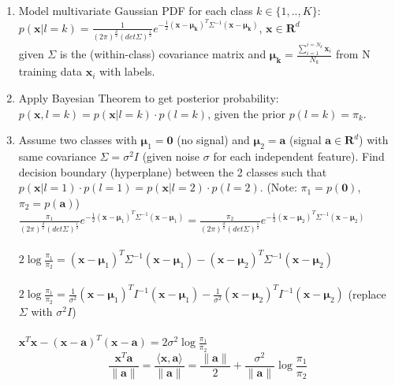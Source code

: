 \documentclass[11pt]{article}
\begin{document}
\begin{enumerate}
    \item Model multivariate Gaussian PDF for each class $k \in \{1,..,K\}$:\\
    $p(\mathbf{x}|l=k) = \frac{1}{{(2\pi)}^{\frac{d}{2}} {(det\Sigma)}^{\frac{1}{2}}} e^{-\frac{1}{2}{(\mathbf{x}-\mathbf{\mu_k})}^T \Sigma^{-1}{(\mathbf{x}-\mathbf{\mu_k})}}$, $\mathbf{x} \in \mathbf{R}^d$\\
    given $\Sigma$ is the (within-class) covariance matrix and $\mathbf{\mu_k} = \frac{\sum_{i=1}^{i=N_k} \mathbf{x}_i}{N_k}$ from N training data $\mathbf{x}_i$ with labels. 
    \item Apply Bayesian Theorem to get posterior probability: $p(\mathbf{x}, l=k) = p(\mathbf{x}|l=k) \cdot p(l=k)$, given the prior $p(l=k) = \pi_k$.
    \item Assume two classes with $\mathbf{\mu}_1 = \mathbf{0}$ (no signal) and $\mathbf{\mu}_2 = \mathbf{a}$ (signal $\mathbf{a} \in \mathbf{R}^d$) with same covariance $\Sigma = \sigma^2 I$ (given noise $\sigma$ for each independent feature). Find decision boundary (hyperplane) between the 2 classes such that $p(\mathbf{x}|l=1)\cdot p(l=1) = p(\mathbf{x}|l=2)\cdot p(l=2)$. (Note: $\pi_1 = p(\mathbf{0})$, $\pi_2 = p(\mathbf{a})$)\\
   
    $\frac{\pi_1}{{(2\pi)}^{\frac{d}{2}} {(det\Sigma)}^{\frac{1}{2}}} e^{-\frac{1}{2}{(\mathbf{x}-\mathbf{\mu}_1)}^T \Sigma^{-1}{(\mathbf{x}-\mathbf{\mu}_1)}} = \frac{\pi_2}{{(2\pi)}^{\frac{d}{2}} {(det\Sigma)}^{\frac{1}{2}}} e^{-\frac{1}{2}{(\mathbf{x}-\mathbf{\mu}_2)}^T \Sigma^{-1}{(\mathbf{x}-\mathbf{\mu}_2)}}$ \\\\
    $2\log{\frac{\pi_1}{\pi_2}} = {(\mathbf{x}-\mathbf{\mu}_1)}^T \Sigma^{-1}{(\mathbf{x}-\mathbf{\mu}_1)} - {(\mathbf{x}-\mathbf{\mu}_2)}^T \Sigma^{-1}{(\mathbf{x}-\mathbf{\mu}_2)}$\\\\
    $2\log{\frac{\pi_1}{\pi_2}} = \frac{1}{\sigma^2}{(\mathbf{x}-\mathbf{\mu}_1)}^T I^{-1}{(\mathbf{x}-\mathbf{\mu}_1)} - \frac{1}{\sigma^2}{(\mathbf{x}-\mathbf{\mu}_2)}^T I^{-1}{(\mathbf{x}-\mathbf{\mu}_2)}$ (replace $\Sigma$ with $\sigma^2 I$)\\\\
    $\mathbf{x}^T\mathbf{x} - {(\mathbf{x}-\mathbf{a})}^T(\mathbf{x}-\mathbf{a}) = 2\sigma^2\log{\frac{\pi_1}{\pi_2}}$
    \begin{equation}
        \frac{\mathbf{x}^T\mathbf{a}}{\lVert \mathbf{a} \rVert} = \frac{\langle \mathbf{x}, \mathbf{a} \rangle}{\lVert \mathbf{a} \rVert} = \frac{\lVert \mathbf{a} \rVert}{2} + \frac{\sigma^2}{\lVert \mathbf{a} \rVert}\log{\frac{\pi_1}{\pi_2}}
    \end{equation}
    

\end{enumerate}
\end{document}

